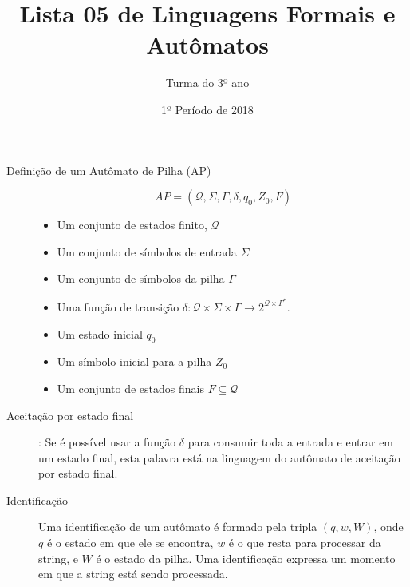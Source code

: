 \documentclass[12pt]{article}
\title{Lista 05 de Linguagens Formais e Autômatos}
\date{1º Período de 2018}
\author{Turma do 3º ano}
\def\cQ{\mathcal{Q}}
\begin{document}
 

\maketitle

\begin{description}


\item[Definição de um Autômato de Pilha (AP)]
\[AP = (\cQ, \Sigma, \Gamma, \delta, q_0, Z_0, F)\]
\begin{itemize}
\item Um conjunto de estados finito, $\cQ$
\item Um conjunto de símbolos de entrada $\Sigma$
\item Um conjunto de símbolos da pilha $\Gamma$
\item Uma função de transição $\delta: \cQ\times\Sigma\times\Gamma\rightarrow 2^{\cQ\times \Gamma^*}$.
\item Um estado inicial $q_0$
\item Um símbolo inicial para a pilha $Z_0$
\item Um conjunto de estados finais $F\subseteq \cQ$
\end{itemize}


\item[Aceitação por estado final]: Se é possível usar a função $\delta$ para consumir toda a entrada e entrar em um estado final, esta palavra está na linguagem do autômato de aceitação por estado final.


\item[Identificação] Uma identificação de um autômato é formado pela tripla $(q,w,W)$, onde $q$ é o estado em que ele se encontra, $w$ é o que resta para processar da string, e $W$ é o estado da pilha.
Uma identificação expressa um momento em que a string está sendo processada.



\end{description}

\vspace{3em}
\end{document}
